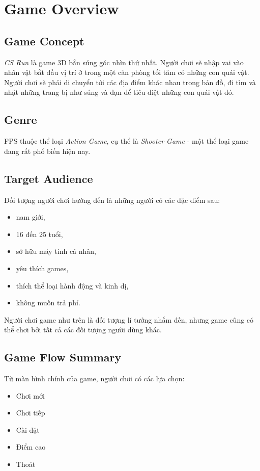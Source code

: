 \documentclass[14pt,a4paper]{extreport}
\begin{document}
\tableofcontents 
\newpage
	
\chapter{Game Overview}
\section{Game Concept}
\textit{CS Run} là game 3D bắn súng góc nhìn thứ nhất. Người chơi sẽ nhập vai vào nhân vật bắt đầu vị trí ở trong một căn phòng tối tăm có những con quái vật. Người chơi sẽ phải di chuyển tới các địa điểm khác nhau trong bản đồ, đi tìm và nhặt những trang bị như súng và đạn để tiêu diệt những con quái vật đó. 


\section{Genre}
FPS thuộc thể loại \textit{Action Game}, cụ thể là \textit{Shooter Game} - một thể loại game đang rất phổ biến hiện nay.


\section{Target Audience}
Đối tượng người chơi hướng đến là những người có các đặc điểm sau:
\begin{itemize}
	\item nam giới,
	\item 16 đến 25 tuổi,
	\item sở hữu máy tính cá nhân,
	\item yêu thích games,
	\item thích thể loại hành động và kinh dị,
	\item không muốn trả phí.
\end{itemize}

Người chơi game như trên là đối tượng lí tưởng nhắm đến, nhưng game cũng có thể chơi bởi tất cả các đối tượng người dùng khác.


\section{Game Flow Summary}
Từ màn hình chính của game, người chơi có các lựa chọn:
\begin{itemize}
	\item Chơi mới
	\item Chơi tiếp
	\item Cài đặt
	\item Điểm cao
	\item Thoát
\end{itemize}
\end{document}
